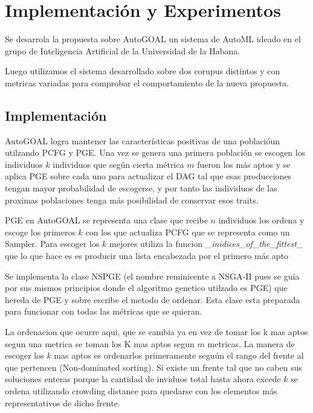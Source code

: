 \chapter{Implementación y Experimentos}\label{chapter:implementation}



Se desarrola la propuesta sobre AutoGOAL un sistema de AutoML ideado en el grupo de Inteligencia Artificial de la Universidad de la Habana.

Luego utilizamos el sistema desarrollado sobre dos corupus distintos y con metricas variadas para comprobar el comportamiento de la nueva propuesta.

\section{Implementaci\'on}


AutoGOAL logra mantener las caracter\'isticas positivas de una poblaci\'oun utilzando PCFG y PGE. Una vez se genera una primera poblaci\'on se escogen los individuos $k$ individuos que seg\'un cierta m\'etrica $m$ fueron los m\'as aptos y se aplica PGE sobre cada uno para actualizar el DAG tal que esas producciones tengan mayor probabilidad de escogerse, y por tanto las individuos de las proximas poblaciones tenga m\'as posibilidad de conservar esos traits.

PGE en AutoGOAL se representa una clase que recibe $n$ individuos los ordena y escoge los primeros $k$ con los que actualiza PCFG que se representa como un Sampler. Para escoger los $k$ mejores utiliza la funcion \textit{\_inidices\_of\_the\_fittest\_} que lo que hace es es producir una lista encabezada por el primero m\'as apto

Se implementa la clase NSPGE (el nombre reminicente a NSGA-II pues se gu\'ia por sus mismos principios donde el algoritmo genetico utilzado es PGE) que hereda de PGE y sobre escribe el metodo de ordenar. Esta clase esta preparada para funcionar con todas las m\'etricas que se quieran.

La ordenacion que ocurre aqui, que se cambia ya en vez de tomar los k mas aptos segun una metrica se toman los K mas aptos segun $m$ metricas.
La manera de escoger los $k$ mas aptos es ordenarlos primeramente segu\'un el rango del frente al que pertencen (Non-dominated sorting). Si existe un frente tal que no caben sus soluciones enteras porque la cantidad de inviduos total hasta ahora excede $k$ se ordena utilizando crowding distance para quedarse con los elementos m\'as representativos de dicho frente.


